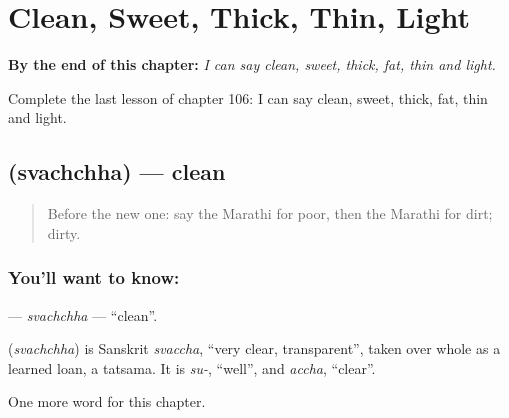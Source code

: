 
\chapter{Clean, Sweet, Thick, Thin, Light}
\label{ch:mr-clean-sweet-thick-thin-light}

\begin{chapteropening}
\textbf{By the end of this chapter:} \emph{I can say clean, sweet, thick, fat, thin and light.}

Complete the last lesson of chapter 106: I can say clean, sweet, thick, fat, thin and light.
\end{chapteropening}

\section[\texorpdfstring{\mr{स्वच्छ} (svachchha)}{स्वच्छ (svachchha)}]{ (svachchha) — clean}

\label{lesson:MR-C106-svachchha}



\begin{quote}
Before the new one: say the Marathi for poor, then the Marathi for dirt; dirty.
\end{quote}

\subsection*{You'll want to know: }
\textbf{} — \emph{svachchha} — \textquotedblleft{}clean\textquotedblright{}.

\begin{cousinweb}
\textbf{} (\emph{svachchha}) is Sanskrit \emph{svaccha}, \textquotedblleft{}very clear, transparent\textquotedblright{}, taken over whole as a learned loan, a tatsama. It is \emph{su-}, \textquotedblleft{}well\textquotedblright{}, and \emph{accha}, \textquotedblleft{}clear\textquotedblright{}.
\end{cousinweb}

\begin{grammarlens}[title={What you've built}]
One more word for this chapter.
\end{grammarlens}

